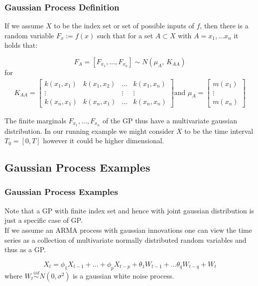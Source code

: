 \documentclass[
	8pt, %
]{beamer}
\begin{document}
\begin{frame}
	\frametitle{Gaussian Process Definition}


If we assume $X$ to be the index set or set of possible inputs of $f$, then there is a random variable
$F_x := f(x)$ such that for a set $A \subset X$ with $A={x_1, \dots x_n}$ it holds that:

\[F_A = [F_{x_1}, \dots , F_{x_n}] \sim N(\mu_A,\,K_{AA})\]
for
\begin{gather}\label{def:Kernel-Matrix}
    K_{AA} =
    \begin{bmatrix}
        k(x_1, x_1) & k(x_1, x_2) & \dots & k(x_1, x_n)\\
        \vdots  &  & \vdots  & \vdots \\
        k(x_n, x_1)  & k(x_n, x_1) & \dots  & k(x_n, x_n)
    \end{bmatrix} \text{and }
    \mu_A =
    \begin{bmatrix}
        m(x_1) \\
        \vdots \\
        m(x_n)
    \end{bmatrix}
\end{gather}

The finite marginals $F_{x_1}, \dots, F_{x_n}$ of the GP thus have a multivariate gaussian distribution.
In our running example we might consider $X$ to be the time interval $T_0=[0, T]$ however it could be higher dimensional.

\end{frame}

\subsection{Gaussian Process Examples}

\begin{frame}
	\frametitle{Gaussian Process Examples}
	Note that a GP with finite index set and hence with joint gaussian distribution is just a specific case
of GP. \\

	If we assume an ARMA process with gaussian innovations one can view the time series
as a collection of multivariate normally distributed random variables and thus as a GP.

	\[
        X_t =  \phi_1 X_{t-1} + \dots + \phi_p X_{t-p} + \theta_1 W_{t-1} + \dots \theta_q W_{t-q} + W_t
    \]
    where $W_t \stackrel{iid}{\sim} N(0, \sigma^2)$ is a gaussian white noise process.


\end{frame}
\end{document}
